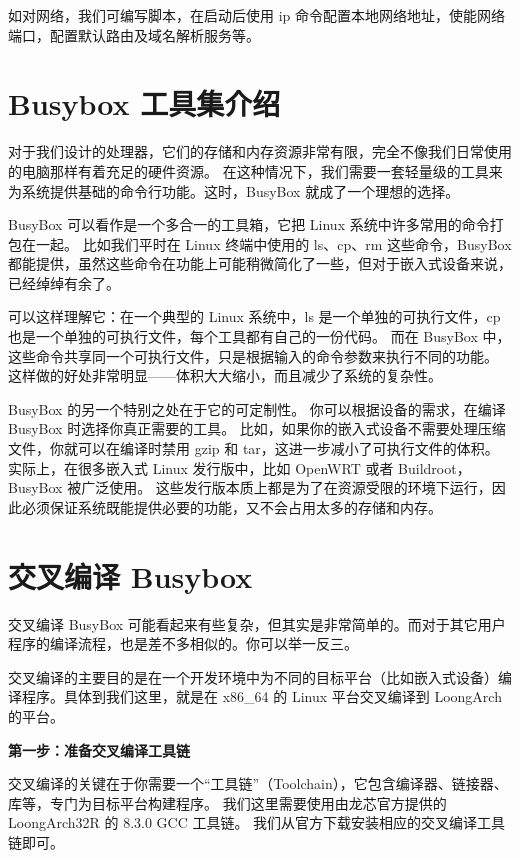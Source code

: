 如对网络，我们可编写脚本，在启动后使用 ip 命令配置本地网络地址，使能网络端口，配置默认路由及域名解析服务等。

\section{Busybox 工具集介绍}\label{sec:14-software-002}

对于我们设计的处理器，它们的存储和内存资源非常有限，完全不像我们日常使用的电脑那样有着充足的硬件资源。
在这种情况下，我们需要一套轻量级的工具来为系统提供基础的命令行功能。这时，BusyBox 就成了一个理想的选择。

BusyBox 可以看作是一个多合一的工具箱，它把 Linux 系统中许多常用的命令打包在一起。
比如我们平时在 Linux 终端中使用的 ls、cp、rm 这些命令，BusyBox 都能提供，虽然这些命令在功能上可能稍微简化了一些，但对于嵌入式设备来说，已经绰绰有余了。

可以这样理解它：在一个典型的 Linux 系统中，ls 是一个单独的可执行文件，cp 也是一个单独的可执行文件，每个工具都有自己的一份代码。
而在 BusyBox 中，这些命令共享同一个可执行文件，只是根据输入的命令参数来执行不同的功能。
这样做的好处非常明显------体积大大缩小，而且减少了系统的复杂性。

BusyBox 的另一个特别之处在于它的可定制性。
你可以根据设备的需求，在编译 BusyBox 时选择你真正需要的工具。
比如，如果你的嵌入式设备不需要处理压缩文件，你就可以在编译时禁用 gzip 和 tar，这进一步减小了可执行文件的体积。
实际上，在很多嵌入式 Linux 发行版中，比如 OpenWRT 或者 Buildroot， BusyBox 被广泛使用。
这些发行版本质上都是为了在资源受限的环境下运行，因此必须保证系统既能提供必要的功能，又不会占用太多的存储和内存。

\section{交叉编译 Busybox}\label{sec:14-software-003}

交叉编译 BusyBox 可能看起来有些复杂，但其实是非常简单的。而对于其它用户程序的编译流程，也是差不多相似的。你可以举一反三。

交叉编译的主要目的是在一个开发环境中为不同的目标平台（比如嵌入式设备）编译程序。具体到我们这里，就是在 x86\_64 的 Linux 平台交叉编译到 LoongArch 的平台。

\textbf{第一步：准备交叉编译工具链}

交叉编译的关键在于你需要一个``工具链''（Toolchain），它包含编译器、链接器、库等，专门为目标平台构建程序。
我们这里需要使用由龙芯官方提供的 LoongArch32R 的 8.3.0 GCC 工具链。
我们从官方下载安装相应的交叉编译工具链即可。

